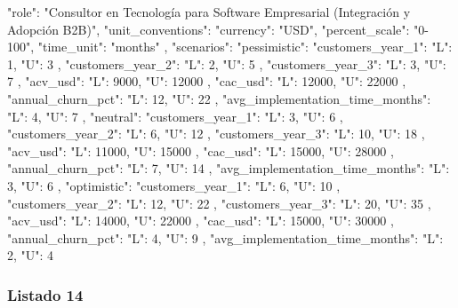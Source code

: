 \begin{APACode}
{
  "role": "Consultor en Tecnología para Software Empresarial (Integración y Adopción B2B)",
  "unit_conventions": {
    "currency": "USD",
    "percent_scale": "0-100",
    "time_unit": "months"
  },
  "scenarios": {
    "pessimistic": {
      "customers_year_1": {
        "L": 1,
        "U": 3
      },
      "customers_year_2": {
        "L": 2,
        "U": 5
      },
      "customers_year_3": {
        "L": 3,
        "U": 7
      },
      "acv_usd": {
        "L": 9000,
        "U": 12000
      },
      "cac_usd": {
        "L": 12000,
        "U": 22000
      },
      "annual_churn_pct": {
        "L": 12,
        "U": 22
      },
      "avg_implementation_time_months": {
        "L": 4,
        "U": 7
      }
    },
    "neutral": {
      "customers_year_1": {
        "L": 3,
        "U": 6
      },
      "customers_year_2": {
        "L": 6,
        "U": 12
      },
      "customers_year_3": {
        "L": 10,
        "U": 18
      },
      "acv_usd": {
        "L": 11000,
        "U": 15000
      },
      "cac_usd": {
        "L": 15000,
        "U": 28000
      },
      "annual_churn_pct": {
        "L": 7,
        "U": 14
      },
      "avg_implementation_time_months": {
        "L": 3,
        "U": 6
      }
    },
    "optimistic": {
      "customers_year_1": {
        "L": 6,
        "U": 10
      },
      "customers_year_2": {
        "L": 12,
        "U": 22
      },
      "customers_year_3": {
        "L": 20,
        "U": 35
      },
      "acv_usd": {
        "L": 14000,
        "U": 22000
      },
      "cac_usd": {
        "L": 15000,
        "U": 30000
      },
      "annual_churn_pct": {
        "L": 4,
        "U": 9
      },
      "avg_implementation_time_months": {
        "L": 2,
        "U": 4
      }
    }
  }
}
\end{APACode}

\subsubsection{Listado 14}
\label{anexo:code-6-3-2-14}

